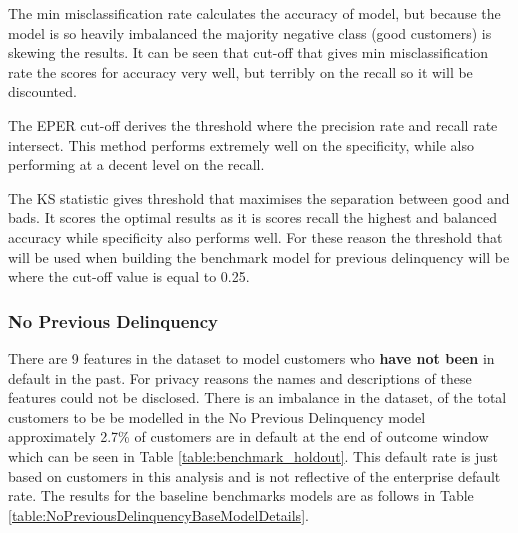 The min misclassification rate calculates the accuracy of model, but because the model is so heavily imbalanced the majority negative class (good customers) is skewing the results. It can be seen that cut-off that gives min misclassification rate the scores for accuracy very well, but terribly on the recall so it will be discounted.

The EPER cut-off derives the threshold where the precision rate and recall rate intersect. This method performs extremely well on the specificity, while also performing at a decent level on the recall.

The KS statistic gives threshold that maximises the separation between good and bads. It scores the optimal results as it is scores recall the highest and balanced accuracy while specificity also performs well. For these reason the threshold that will be used when building the benchmark model for previous delinquency will be where the cut-off value is equal to 0.25.


\subsubsection{No Previous Delinquency}

There are 9 features in the dataset to model customers who \textbf{have not been} in default in the past. For privacy reasons the names and descriptions of these features could not be disclosed. There is an imbalance in the dataset, of the total customers to be be modelled in the No Previous Delinquency model approximately 2.7\% of customers are in default at the end of outcome window which can be seen in Table \ref{table:benchmark_holdout}. This default rate is just based on customers in this analysis and is not reflective of the enterprise default rate. The results for the baseline benchmarks models are as follows in Table \ref{table:NoPreviousDelinquencyBaseModelDetails}.


